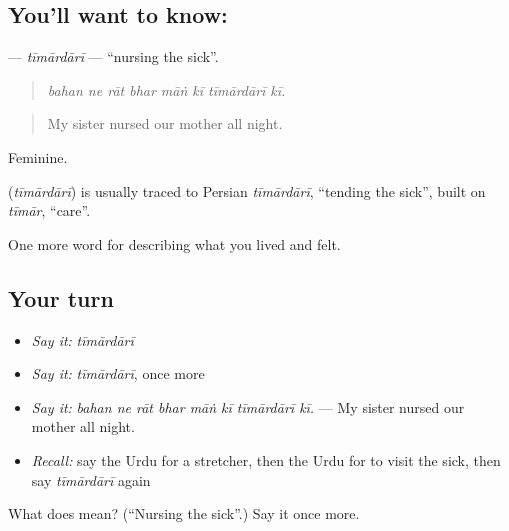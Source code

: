 \subsection*{You'll want to know: }
\textbf{} — \emph{tīmārdārī} — \textquotedblleft{}nursing the sick\textquotedblright{}.

\begin{quote}
       
\end{quote}

\begin{quote}
\emph{bahan ne rāt bhar māṅ kī tīmārdārī kī.}
\end{quote}

\begin{quote}
My sister nursed our mother all night.
\end{quote}

Feminine.

\begin{cousinweb}
\textbf{} (\emph{tīmārdārī}) is usually traced to Persian \emph{tīmārdārī}, \textquotedblleft{}tending the sick\textquotedblright{}, built on \emph{tīmār}, \textquotedblleft{}care\textquotedblright{}.
\end{cousinweb}

\begin{grammarlens}[title={What you've built}]
One more word for describing what you lived and felt.
\end{grammarlens}

\subsection*{Your turn}
\begin{itemize}
\raggedright
  \item \emph{Say it:} \emph{tīmārdārī}
  \item \emph{Say it:} \emph{tīmārdārī}, once more
  \item \emph{Say it:} \emph{bahan ne rāt bhar māṅ kī tīmārdārī kī.} — My sister nursed our mother all night.
  \item \emph{Recall:} say the Urdu for a stretcher, then the Urdu for to visit the sick, then say \emph{tīmārdārī} again
\end{itemize}

\begin{tcolorbox}[breakable,colback=teal!4,colframe=teal!35!black,title={Before you move on}]
What does  mean? (\textquotedblleft{}Nursing the sick\textquotedblright{}.) Say it once more.
\end{tcolorbox}
